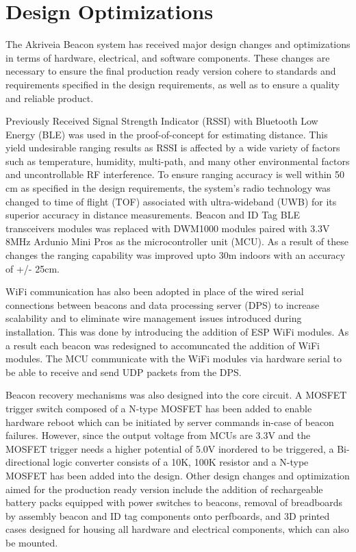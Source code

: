 

\setcounter{section}{1}
\section{Design Optimizations}

\bigskip
The Akriveia Beacon system has received major design changes and optimizations in terms of hardware, electrical, and software components. These changes are necessary to ensure the final production ready version cohere to standards and requirements specified in the design requirements, as well as to ensure a quality and reliable product.

\bigskip
Previously Received Signal Strength Indicator (RSSI) with Bluetooth Low Energy (BLE) was used in the proof-of-concept for estimating distance. This yield undesirable ranging results as RSSI is affected by a wide variety of factors such as temperature, humidity, multi-path, and many other environmental factors and uncontrollable RF interference. To ensure ranging accuracy is well within 50 cm as specified in the design requirements, the system's radio technology was changed to time of flight (TOF) associated with ultra-wideband (UWB) for its superior accuracy in distance measurements. Beacon and ID Tag BLE transceivers modules was replaced with DWM1000 modules paired with 3.3V 8MHz Ardunio Mini Pros as the microcontroller unit (MCU). As a result of these changes the ranging capability was improved upto 30m indoors with an accuracy of +/- 25cm. 

\bigskip
WiFi communication has also been adopted in place of the wired serial connections between beacons and data processing server (DPS) to increase scalability and to eliminate wire management issues introduced during installation. This was done by introducing the addition of ESP WiFi modules. As a result each beacon was redesigned to accomuncated the addition of WiFi modules. The MCU communicate with the WiFi modules via hardware serial to be able to receive and send UDP packets from the DPS.

\bigskip
Beacon recovery mechanisms was also designed into the core circuit. A MOSFET trigger switch composed of a N-type MOSFET has been added to enable hardware reboot which can be initiated by server commands in-case of beacon failures. However, since the output voltage from MCUs are 3.3V and the MOSFET trigger needs a higher potential of 5.0V inordered to be triggered, a Bi-directional logic converter consists of a 10K, 100K resistor and a N-type MOSFET has been added into the design. Other design changes and optimization aimed for the production ready version include the addition of rechargeable battery packs equipped with power switches to beacons, removal of breadboards by assembly beacon and ID tag components onto perfboards, and 3D printed cases designed for housing all hardware and electrical components, which can also be mounted.
